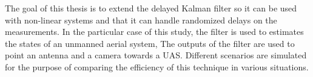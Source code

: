 %
%
%

\begin{publicabstract}

The goal of this thesis is to extend the delayed Kalman filter so it can be used with non-linear systems and that it can handle randomized delays on the measurements. In the particular case of this study, the filter is used to estimates the states of an unmanned aerial system, The outputs of the filter are used to point an antenna and a camera towards a UAS. Different scenarios are simulated for the purpose of comparing the efficiency of this technique in various situations. 

\end{publicabstract}


